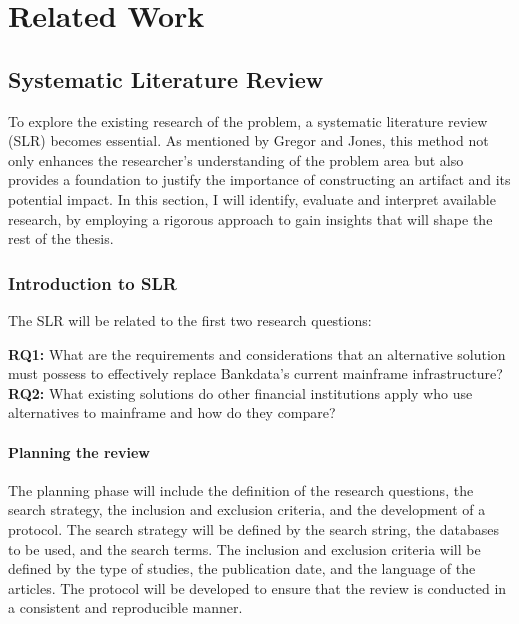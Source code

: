 \chapter{Related Work}
\label{chap:related}

\section{Systematic Literature Review}
To explore the existing research of the problem, a systematic literature review (SLR) becomes essential. As mentioned by Gregor and Jones, this method not only enhances the researcher's understanding of the problem area but also provides a foundation to justify the importance of constructing an artifact and its potential impact. In this section, I will identify, evaluate and interpret available research, by employing a rigorous approach to gain insights that will shape the rest of the thesis.


\subsection{Introduction to SLR}
The SLR will be related to the first two research questions:
\begin{itemize}
    \textbf{RQ1:} What are the requirements and considerations that an alternative solution must possess to effectively replace Bankdata's current mainframe infrastructure? \\
    \textbf{RQ2:} What existing solutions do other financial institutions apply who use alternatives to mainframe and how do they compare? \\
\end{itemize}

\subsubsection{Planning the review}
The planning phase will include the definition of the research questions, the search strategy, the inclusion and exclusion criteria, and the development of a protocol.
The search strategy will be defined by the search string, the databases to be used, and the search terms. The inclusion and exclusion criteria will be defined by the type of studies, the publication date, and the language of the articles. The protocol will be developed to ensure that the review is conducted in a consistent and reproducible manner.

